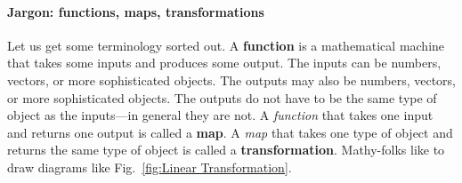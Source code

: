 \documentclass[12pt, oneside]{report}    %
\begin{document}
\paragraph{Jargon: functions, maps, transformations} Let us get some terminology sorted out.
A \textbf{function} is a mathematical machine that takes some inputs and produces some output. The inputs can be numbers, vectors, or more sophisticated objects. The outputs may also be numbers, vectors, or more sophisticated objects. The outputs do not have to be the same type of object as the inputs---in general they are not.
% 
A \emph{function} that takes one input and returns one output is called a \textbf{map}. 
% 
A \emph{map} that takes one type of object and returns the same type of object is called a \textbf{transformation}. Mathy-folks like to draw diagrams like Fig.~\ref{fig:Linear Transformation}.
\end{document}
